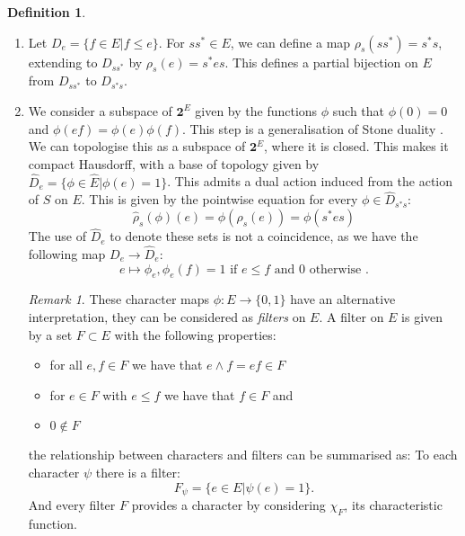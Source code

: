 \documentclass[11pt]{amsart}
\theoremstyle{plain}
\theoremstyle{definition}%
\newtheorem{definition}[theorem]{Definition}%
\theoremstyle{remark}%
\newtheorem{remark}[theorem]{Remark}%
\newcommand{\E}{\widehat{E}}
\begin{document}
\begin{definition}
\begin{enumerate}
\item Let $D_{e}=\lbrace f \in E | f \leq e \rbrace$. For $ss^{*} \in E$, we can define a map $\rho_{s}(ss^{*})=s^{*}s$, extending to $D_{ss^{*}}$ by $\rho_{s}(e) = s^{*}es$. This defines a partial bijection on $E$ from $D_{ss^{*}}$ to $D_{s^{*}s}$. 

\item We consider a subspace of $\textbf{2}^{E}$ given by the functions $\phi$ such that $\phi(0)=0$ and $\phi(ef)=\phi(e)\phi(f)$. This step is a generalisation of Stone duality \cite{MR2672179}. We can topologise this as a subspace of $\textbf{2}^{E}$, where it is closed. This makes it compact Hausdorff, with a base of topology given by $\widehat{D}_{e}= \lbrace \phi \in \E | \phi(e)=1 \rbrace$. This admits a dual action induced from the action of $S$ on $E$. This is given by the pointwise equation for every $\phi \in \widehat{D}_{s^{*}s}$:
\begin{equation*}
\widehat{\rho}_{s}(\phi)(e)=\phi(\rho_{s}(e))=\phi(s^{*}es)
\end{equation*}
The use of $\widehat{D}_{e}$ to denote these sets is not a coincidence, as we have the following map $D_{e} \rightarrow \widehat{D}_{e}$:
\begin{equation*}
e \mapsto \phi_{e}, \phi_{e}(f)=1 \mbox{ if } e \leq f \mbox{ and } 0 \mbox{ otherwise }.
\end{equation*}
\begin{remark}
These character maps $\phi: E \rightarrow \lbrace 0,1 \rbrace$ have an alternative interpretation, they can be considered as \textit{filters} on $E$. A filter on $E$ is given by a set $F \subset E$ with the following properties:
\begin{itemize}
\item for all $e,f \in F$ we have that $e\wedge f=ef \in F$
\item for $e\in F$ with $e \leq f$ we have that $f \in F$ and
\item $0 \not\in F$
\end{itemize}
the relationship between characters and filters can be summarised as: To each character $\psi$ there is a filter:
\begin{equation*}
F_{\psi}= \lbrace e \in E | \psi(e)=1 \rbrace.
\end{equation*}
And every filter $F$ provides a character by considering $\chi_{F}$, its characteristic function.
\end{remark}


\end{enumerate}
\end{definition}
\end{document}

